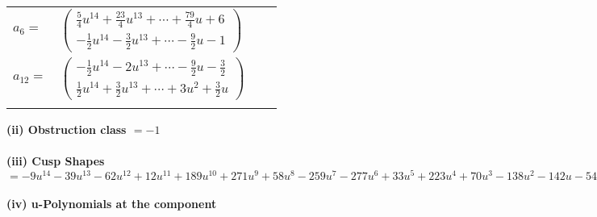\documentclass[1p]{elsarticle_modified}
\theoremstyle{definition}
\begin{document}
\begin{tabular}{m{7pt} m{180pt} m{7pt} m{180pt} }
\flushright $a_{6}=$&$\begin{pmatrix}\frac{5}{4} u^{14}+\frac{23}{4} u^{13}+\cdots+\frac{79}{4} u+6\\-\frac{1}{2} u^{14}-\frac{3}{2} u^{13}+\cdots-\frac{9}{2} u-1\end{pmatrix}$ \\
\flushright $a_{12}=$&$\begin{pmatrix}-\frac{1}{2} u^{14}-2 u^{13}+\cdots-\frac{9}{2} u-\frac{3}{2}\\\frac{1}{2} u^{14}+\frac{3}{2} u^{13}+\cdots+3 u^2+\frac{3}{2} u\end{pmatrix}$\\&\end{tabular}
\flushleft \textbf{(ii) Obstruction class $= -1$}\\~\\
\flushleft \textbf{(iii) Cusp Shapes $= -9 u^{14}-39 u^{13}-62 u^{12}+12 u^{11}+189 u^{10}+271 u^9+58 u^8-259 u^7-277 u^6+33 u^5+223 u^4+70 u^3-138 u^2-142 u-54$}\\~\\
\newpage\renewcommand{\arraystretch}{1}
\flushleft \textbf{(iv) u-Polynomials at the component}\newline \\
\end{document}
